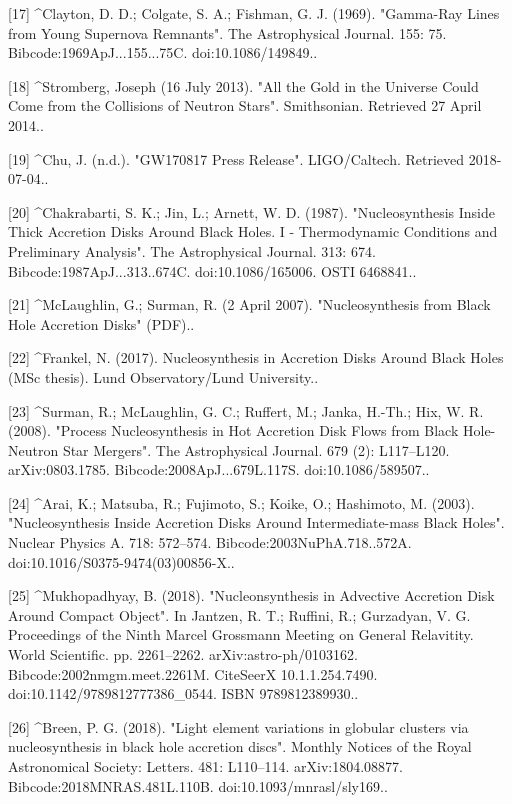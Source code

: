 [17]
^Clayton, D. D.; Colgate, S. A.; Fishman, G. J. (1969). "Gamma-Ray Lines from Young Supernova Remnants". The Astrophysical Journal. 155: 75. Bibcode:1969ApJ...155...75C. doi:10.1086/149849..

[18]
^Stromberg, Joseph (16 July 2013). "All the Gold in the Universe Could Come from the Collisions of Neutron Stars". Smithsonian. Retrieved 27 April 2014..

[19]
^Chu, J. (n.d.). "GW170817 Press Release". LIGO/Caltech. Retrieved 2018-07-04..

[20]
^Chakrabarti, S. K.; Jin, L.; Arnett, W. D. (1987). "Nucleosynthesis Inside Thick Accretion Disks Around Black Holes. I - Thermodynamic Conditions and Preliminary Analysis". The Astrophysical Journal. 313: 674. Bibcode:1987ApJ...313..674C. doi:10.1086/165006. OSTI 6468841..

[21]
^McLaughlin, G.; Surman, R. (2 April 2007). "Nucleosynthesis from Black Hole Accretion Disks" (PDF)..

[22]
^Frankel, N. (2017). Nucleosynthesis in Accretion Disks Around Black Holes (MSc thesis). Lund Observatory/Lund University..

[23]
^Surman, R.; McLaughlin, G. C.; Ruffert, M.; Janka, H.-Th.; Hix, W. R. (2008). "Process Nucleosynthesis in Hot Accretion Disk Flows from Black Hole-Neutron Star Mergers". The Astrophysical Journal. 679 (2): L117–L120. arXiv:0803.1785. Bibcode:2008ApJ...679L.117S. doi:10.1086/589507..

[24]
^Arai, K.; Matsuba, R.; Fujimoto, S.; Koike, O.; Hashimoto, M. (2003). "Nucleosynthesis Inside Accretion Disks Around Intermediate-mass Black Holes". Nuclear Physics A. 718: 572–574. Bibcode:2003NuPhA.718..572A. doi:10.1016/S0375-9474(03)00856-X..

[25]
^Mukhopadhyay, B. (2018). "Nucleonsynthesis in Advective Accretion Disk Around Compact Object". In Jantzen, R. T.; Ruffini, R.; Gurzadyan, V. G. Proceedings of the Ninth Marcel Grossmann Meeting on General Relavitity. World Scientific. pp. 2261–2262. arXiv:astro-ph/0103162. Bibcode:2002nmgm.meet.2261M. CiteSeerX 10.1.1.254.7490. doi:10.1142/9789812777386_0544. ISBN 9789812389930..

[26]
^Breen, P. G. (2018). "Light element variations in globular clusters via nucleosynthesis in black hole accretion discs". Monthly Notices of the Royal Astronomical Society: Letters. 481: L110–114. arXiv:1804.08877. Bibcode:2018MNRAS.481L.110B. doi:10.1093/mnrasl/sly169..